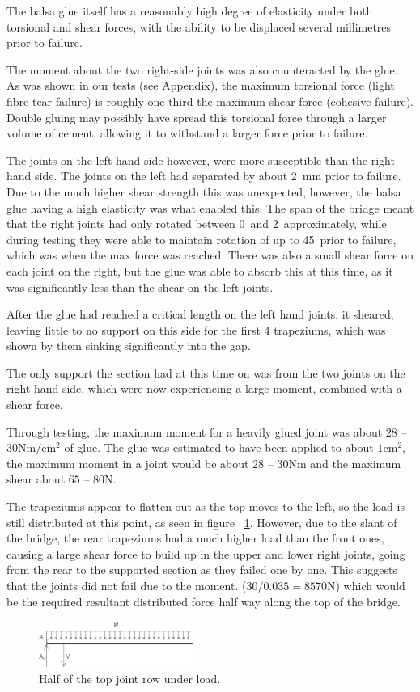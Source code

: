 \documentclass[12pt]{article}
\begin{document}
The balsa glue itself has a reasonably high degree of elasticity under both torsional and shear forces, with the ability to be displaced several millimetres prior to failure. 

The moment about the two right-side joints was also counteracted by the glue. As was shown in our tests (see Appendix), the maximum torsional force (light fibre-tear failure) is roughly one third the maximum shear force (cohesive failure). Double gluing may possibly have spread this torsional force through a larger volume of cement, allowing it to withstand a larger force prior to failure. 

The joints on the left hand side however, were more susceptible than the right hand side. The joints on the left had separated by about 2~mm prior to failure. Due to the much higher shear strength this was unexpected, however, the balsa glue having a high elasticity was what enabled this. The span of the bridge meant that the right joints had only rotated between 0\textdegree~and 2\textdegree~approximately, while during testing they were able to maintain rotation of up to 45\textdegree~prior to failure, which was when the max force was reached. There was also a small shear force on each joint on the right, but the glue was able to absorb this at this time, as it was significantly less than the shear on the left joints.

After the glue had reached a critical length on the left hand joints, it sheared, leaving little to no support on this side for the first 4 trapeziums, which was shown by them sinking significantly into the gap.

The only support the section had at this time on was from the two joints on the right hand side, which were now experiencing a large moment, combined with a shear force. 

Through testing, the maximum moment for a heavily glued joint was about $28$ -- $30\mathrm{Nm/cm^2}$ of glue. The glue was estimated to have been applied to about $1\mathrm{cm^2}$, the maximum moment in a joint would be about $28$ -- $30\mathrm{Nm}$ and the maximum shear about $65$ -- $80\mathrm{N}$. 

The trapeziums appear to flatten out as the top moves to the left, so the load is still distributed at this point, as seen in figure ~\ref{loadtop}. However, due to the slant of the bridge, the rear trapeziums had a much higher load than the front ones, causing a large shear force to build up in the upper and lower right joints, going from the rear to the supported section as they failed one by one. This suggests that the joints did not fail due to the moment. ($30 / 0.035 = 8570\mathrm{N}$) which would be the required resultant distributed force half way along the top of the bridge. 
 			\begin{figure}[h!]
				\centering
				\includegraphics[width=0.45\textwidth]{loadtop}
				\caption{Half of the top joint row under load.}
				\label{loadtop}
				\end{figure}
\end{document}
